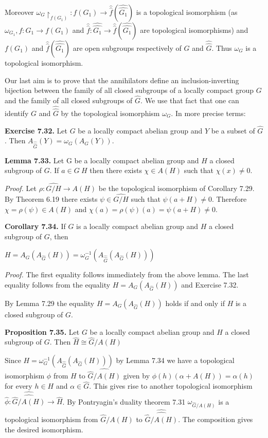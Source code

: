 \documentclass[12pt]{article}
\begin{document}
    Moreover $\omega_G \upharpoonright_{f(G_1)}: f(G_1) \to \hat{\hat{f}}(\hat{\hat{G_1}})$ is a topological isomorphism (as $\omega_{G_1}, f : G_1 \to f(G_1)$
and $\hat{\hat{f}} : \hat{\hat{G_1}} \to \hat{\hat{f}}(\hat{\hat{G_1}})$ are topological isomorphisms) and $f(G_1)$ and $\hat{\hat{f}}(\hat{\hat{G_1}})$ are open subgroups respectively of $G$ and $\hat{\hat{G}}$. Thus
$\omega_G$ is a topological isomorphism.


    Our last aim is to prove that the annihilators define an inclusion-inverting bijection between the family of
all closed subgroups of a locally compact group $G$ and the family of all closed subgroups of $\hat{G}$. We use that fact
that one can identify $G$ and $\hat{\hat{G}}$ by the topological isomorphism $\omega_G$. In more precise terms:


\textbf{Exercise 7.32.} Let $G$ be a locally compact abelian group and $Y$ be a subset of $\hat{G}$. Then $A_{\hat{\hat{G}}}(Y ) = \omega_G(A_G(Y ))$.


\textbf{Lemma 7.33.} Let G be a locally compact abelian group and $H$ a closed subgroup of $G$. If $a \in G \ H$ then there
exists $\chi \in A(H)$ such that $\chi(x) \neq 0$.


\emph{Proof.} Let $\rho : \hat{G/H} \to A(H)$ be the topological isomorphism of Corollary 7.29. By Theorem 6.19 there exists
$\psi \in \hat{G/H}$ such that $\psi(a + H) \neq 0$. Therefore $\chi = \rho(\psi) \in A(H)$ and $\chi(a) = \rho(\psi)(a) = \psi(a + H) \neq 0$.


\textbf{Corollary 7.34.} If $G$ is a locally compact abelian group and $H$ a closed subgroup of $G$, then


    $H = A_G (A_{\hat{G}}(H)) = \omega_G^{-1}(A_{\hat{\hat{G}}}(A_{\hat{G}}(H)))$


\emph{Proof.} The first equality follows immediately from the above lemma.
The last equality follows from the equality $H = A_G (A_{\hat{G}}(H))$ and Exercise 7.32.


    By Lemma 7.29 the equality $H = A_G (A_{\hat{G}}(H))$ holds if and only if $H$ is a closed subgroup of $G$.


\textbf{Proposition 7.35.} Let $G$ be a locally compact abelian group and $H$ a closed subgroup of $G$. Then $\hat{H} \cong \hat{G} / A(H)$


 Since $H = \omega_G^{-1}(A_{\hat{\hat{G}}}(A_{\hat{G}}(H)))$  by Lemma 7.34 we have a topological isomorphism $\phi$ from $H$ to $\hat{\hat{G} / A(H)}$
given by $\phi(h)(\alpha + A(H))=\alpha(h)$ for every $h \in H$ and $\alpha \in \hat{G}$. This gives rise to another topological isomorphism
$\hat{\phi} : \hat{\hat{\hat{G} / A(H)}} \to \hat{H}$.  By Pontryagin's duality theorem 7.31 $\omega_{\hat{G}/A(H)}$ is a topological isomorphism from $\hat{G}/A(H)$
to $\hat{\hat{\hat{G} / A(H)}}$. The composition gives the desired isomorphism.
\end{document}
